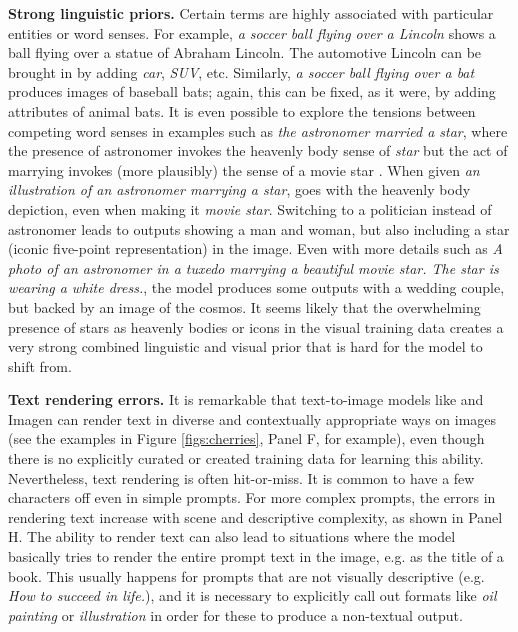 \textbf{Strong linguistic priors.} Certain terms are highly associated with particular entities or word senses. For example, \textit{a soccer ball flying over a Lincoln} shows a ball flying over a statue of Abraham Lincoln. The automotive Lincoln can be brought in by adding \textit{car}, \textit{SUV}, etc. Similarly, \textit{a soccer ball flying over a bat} produces images of baseball bats; again, this can be fixed, as it were, by adding attributes of animal bats. It is even possible to explore the tensions between competing word senses in examples such as \textit{the astronomer married a star}, where the presence of astronomer invokes the heavenly body sense of \textit{star} but the act of marrying invokes (more plausibly) the sense of a movie star \cite{erk-herbelot-2021-marry}. When given \textit{an illustration of an astronomer marrying a star}, \bdraw goes with the heavenly body depiction, even when making it \textit{movie star}. Switching to a politician instead of astronomer leads to outputs showing a man and woman, but also including a star (iconic five-point representation) in the image. Even with more details such as \textit{A photo of an astronomer in a tuxedo marrying a beautiful movie star. The star is wearing a white dress.}, the model produces some outputs with a wedding couple, but backed by an image of the cosmos. It seems likely that the overwhelming presence of stars as heavenly bodies or icons in the visual training data creates a very strong combined linguistic and visual prior that is hard for the model to shift from. 

\textbf{Text rendering errors.} It is remarkable that text-to-image models like \bdraw and Imagen can render text in diverse and contextually appropriate ways on images (see the examples in Figure \ref{figs:cherries}, Panel F, for example), even though there is no explicitly curated or created training data for learning this ability. Nevertheless, text rendering is often hit-or-miss. It is common to have a few characters off even in simple prompts. For more complex prompts, the errors in rendering text increase with scene and descriptive complexity, as shown in Panel H. The ability to render text can also lead to situations where the model basically tries to render the entire prompt text in the image, e.g. as the title of a book. This usually happens for prompts that are not visually descriptive (e.g. \textit{How to succeed in life.}), and it is necessary to explicitly call out formats like \textit{oil painting} or \textit{illustration} in order for these to produce a non-textual output.

